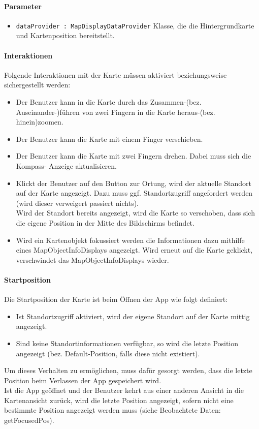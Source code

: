 \paragraph*{Parameter}
\begin{itemize}
    \item \texttt{dataProvider : MapDisplayDataProvider} Klasse, die die Hintergrundkarte und Kartenposition bereitstellt.
\end{itemize}

\paragraph*{Interaktionen}
Folgende Interaktionen mit der Karte müssen aktiviert beziehungsweise sichergestellt werden:
\begin{itemize}
    \item Der Benutzer kann in die Karte durch das Zusammen-(bez. Auseinander-)führen von zwei 
    Fingern in die Karte heraus-(bez. hinein)zoomen.
    \item Der Benutzer kann die Karte mit einem Finger verschieben.
    \item Der Benutzer kann die Karte mit zwei Fingern drehen. Dabei muss sich die Kompass-
    Anzeige aktualisieren.
    \item Klickt der Benutzer auf den Button zur Ortung, wird der aktuelle Standort auf der Karte 
    angezeigt. Dazu muss ggf. Standortzugriff angefordert werden (wird dieser verweigert passiert 
    nichts).\\
    Wird der Standort bereits angezeigt, wird die Karte so verschoben, dass sich die eigene Position 
    in der Mitte des Bildschirms befindet. \\
    \item Wird ein Kartenobjekt fokussiert werden die Informationen dazu mithilfe eines MapObjectInfoDisplays angezeigt. 
    Wird erneut auf die Karte geklickt, verschwindet das MapObjectInfoDisplays wieder.

\end{itemize}

\paragraph*{Startposition}
Die Startposition der Karte ist beim Öffnen der App wie folgt definiert:
\begin{itemize}
    \item Ist Standortzugriff aktiviert, wird der eigene Standort auf der Karte mittig angezeigt.
    \item Sind keine Standortinformationen verfügbar, so wird die letzte Position angezeigt 
    (bez. Default-Position, falls diese nicht existiert).
\end{itemize}
Um dieses Verhalten zu ermöglichen, muss dafür gesorgt werden, dass die letzte Position beim Verlassen 
der App gespeichert wird.\\
Ist die App geöffnet und der Benutzer kehrt aus einer anderen Ansicht in die Kartenansicht zurück,
wird die letzte Position angezeigt, sofern nicht eine bestimmte Position angezeigt werden muss 
(siehe Beobachtete Daten: getFocusedPos).

